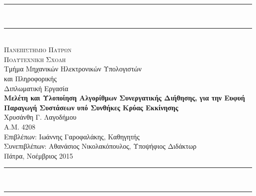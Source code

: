 \newcommand{\HRule}{\rule{\linewidth}{0.5mm}}
\newcommand{\Hrule}{\rule{\linewidth}{0.3mm}}


\begin{titlepage}
 
\begin{center}
\HRule \\ \vspace{-10pt}
\rule{10cm}{0.3mm}\\
\vspace{.4cm}
 \textsc{{\Large Πανεπιστημιο Πατρων}} \\
\vspace{.2cm}
\textsc{{\Large Πολυτεχνικη Σχολη}} \\
\vspace{.1cm}
{\large Τμήμα Μηχανικών Ηλεκτρονικών Υπολογιστών \\  και Πληροφορικής} \\
\vspace{3cm} 
{\large Διπλωματική Εργασία} \\
\vspace{2cm}
\textbf{{\Large \textsf{Μελέτη και Υλοποίηση Αλγορίθμων Συνεργατικής Διήθησης, για την Ευφυή Παραγωγή Συστάσεων υπό Συνθήκες Κρύας Εκκίνησης}}}\\
\vspace{2cm}
{\large Χρυσάνθη Γ. Λαγοδήμου} \\
\small{Α.Μ. 4208} \\
\vspace{2.5cm}
{\large Επιβλέπων: Ιωάννης Γαροφαλάκης, Καθηγητής}\\
\vspace{0.2cm}
{\large Συνεπιβλέπων: Αθανάσιος Νικολακόπουλος, Υποψήφιος Διδάκτωρ}\\
\vspace{1cm}
{\normalsize{Πάτρα, Νοέμβριος 2015}} \\
\vspace{.2cm}
\rule{10cm}{0.3mm}\\ \vspace{-10pt}
\HRule 
\end{center}
\end{titlepage}
 

